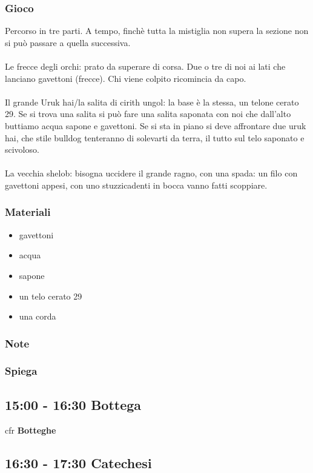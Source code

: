 \documentclass[../main.tex]{subfiles}
\begin{document}
        \subsubsection{Gioco}
        Percorso in tre parti. A tempo, finchè tutta la mistiglia non supera la sezione non si può passare a quella successiva. \\
\\
Le frecce degli orchi: prato da superare di corsa. Due o tre di noi ai lati che lanciano gavettoni (frecce). Chi viene colpito ricomincia da capo.\\
\\
Il grande Uruk hai/la salita di cirith ungol: la base è la stessa, un telone cerato 29. Se si trova una salita si può fare una salita saponata con noi che dall’alto buttiamo acqua sapone e gavettoni. Se si sta in piano si deve affrontare due uruk hai, che stile bulldog tenteranno di solevarti da terra, il tutto sul telo saponato e scivoloso.\\ 
\\
La vecchia shelob: bisogna uccidere il grande ragno, con una spada: un filo con gavettoni appesi, con uno stuzzicadenti in bocca vanno fatti scoppiare. 
        \subsubsection{Materiali}
        \begin{itemize}
            \item gavettoni
            \item acqua
            \item sapone
            \item un telo cerato 29
            \item una corda
        \end{itemize}
        \subsubsection{Note}
        \subsubsection{Spiega}

    \subsection{15:00 - 16:30 Bottega}
   cfr \textbf{Botteghe}
    
    \subsection{16:30 - 17:30 Catechesi}   
\end{document}
